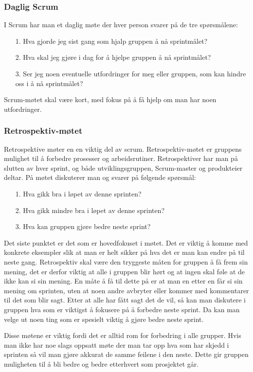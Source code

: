 \documentclass[12pt,a4paper,norsk]{article}
\begin{document}
	\subsubsection{Daglig Scrum}
	I Scrum har man et daglig møte der hver person svarer på de tre spørsmålene:
	\begin{itemize}
    \item[1.] Hva gjorde jeg sist gang som hjalp gruppen å nå sprintmålet?
    \item[2.] Hva skal jeg gjøre i dag for å hjelpe gruppen å nå sprintmålet?
    \item[3.]   Ser jeg noen eventuelle utfordringer for meg eller gruppen, som kan hindre oss i å nå sprintmålet?
    \end{itemize}
    Scrum-møtet skal være kort, med fokus på å få hjelp om man har noen utfordringer.
	\subsubsection{Retrospektiv-møtet}
	Retrospektive møter en en viktig del av scrum. Retrospektiv-møtet er gruppens mulighet til å forbedre prosesser og arbeidsrutiner. Retrospektiver har man på slutten av hver sprint, og både utviklingsgruppen, Scrum-master og produkteier deltar. På møtet diskuterer man og svarer på følgende spørsmål:
	\begin{itemize}
    \item[1.] Hva gikk bra i løpet av denne sprinten?
    \item[2.] Hva gikk mindre bra i løpet av denne sprinten?
    \item[3.] Hva kan gruppen gjøre bedre neste sprint?
    \end{itemize}
    Det siste punktet er det som er hovedfokuset i møtet. Det er viktig å komme med konkrete eksempler slik at man er helt sikker på hva det er man kan endre på til neste gang. Retrospektiv skal være den tryggeste måten for gruppen å få frem sin mening, det er derfor viktig at alle i gruppen blir hørt og at ingen skal føle at de ikke kan si sin mening. En måte å få til dette på er at man en etter en får si sin mening om sprinten, uten at noen andre avbryter eller kommer med kommentarer til det som blir sagt. Etter at alle har fått sagt det de vil, så kan man diskutere i gruppen hva som er viktigst å fokusere på å forbedre neste sprint. Da kan man velge ut noen ting som er spesielt viktig å gjøre bedre neste sprint. 

    Disse møtene er viktig fordi det er alltid rom for forbedring i alle grupper. Hvis man ikke har noe slags oppsatt møte der man tar opp hva som har skjedd i sprinten så vil man gjøre akkurat de samme feilene i den neste. Dette gir gruppen muligheten til å bli bedre og bedre etterhvert som prosjektet går\cite[side 82 - 88]{kniberg}.
\end{document}
